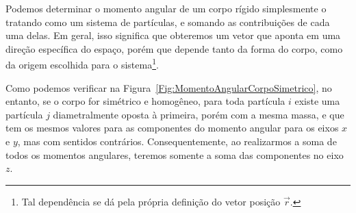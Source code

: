 Podemos determinar o momento angular de um corpo rígido simplesmente o tratando como um sistema de partículas, e somando as contribuições de cada uma delas. Em geral, isso significa que obteremos um vetor que aponta em uma direção específica do espaço, porém que depende tanto da forma do corpo, como da origem escolhida para o sistema\footnote{Tal dependência se dá pela própria definição do vetor posição $\vec{r}$.}.

Como podemos verificar na Figura~\ref{Fig:MomentoAngularCorpoSimetrico}, no entanto, se o corpo for simétrico e homogêneo, para toda partícula $i$ existe uma partícula $j$ diametralmente oposta à primeira, porém com a mesma massa, e que tem os mesmos valores para as componentes do momento angular para os eixos $x$ e $y$, mas com sentidos contrários. Consequentemente, ao realizarmos a soma de todos os momentos angulares, teremos somente a soma das componentes no eixo $z$.

